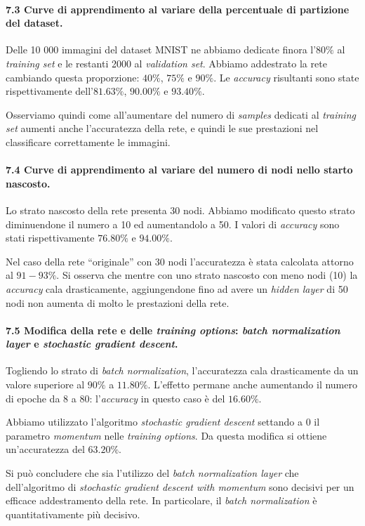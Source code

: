 \documentclass[a4paper,12pt]{article}
\begin{document}
\paragraph{7.3 Curve di apprendimento al variare della percentuale di partizione del dataset.} Delle 10 000 immagini del dataset MNIST ne abbiamo dedicate finora l'$80\%$ al \emph{training set} e le restanti 2000 al \emph{validation set}. Abbiamo addestrato la rete cambiando questa proporzione: $40\%$, $75\%$ e $90\%$. Le \emph{accuracy} risultanti sono state rispettivamente dell'$81.63\%$, $90.00\%$ e $93.40\%$.

Osserviamo quindi come all'aumentare del numero di \emph{samples} dedicati al \emph{training set} aumenti anche l'accuratezza della rete, e quindi le sue prestazioni nel classificare correttamente le immagini.


\paragraph{7.4 Curve di apprendimento al variare del numero di nodi nello starto nascosto.} Lo strato nascosto della rete presenta 30 nodi. Abbiamo modificato questo strato diminuendone il numero a 10 ed aumentandolo a 50. I valori di \emph{accuracy} sono stati rispettivamente $76.80\%$ e $94.00\%$.

Nel caso della rete ``originale'' con 30 nodi l'accuratezza è stata calcolata attorno al $91-93\%$. Si osserva che mentre con uno strato nascosto con meno nodi (10) la \emph{accuracy} cala drasticamente, aggiungendone fino ad avere un \emph{hidden layer} di 50 nodi non aumenta di molto le prestazioni della rete.


\paragraph{7.5 Modifica della rete e delle \emph{training options}: \emph{batch normalization layer} e \emph{stochastic gradient descent}.} Togliendo lo strato di \emph{batch normalization}, l'accuratezza cala drasticamente da un valore superiore al $90\%$ a $11.80\%$. L'effetto permane anche aumentando il numero di epoche da 8 a 80: l'\emph{accuracy} in questo caso è del $16.60\%$.

Abbiamo utilizzato l'algoritmo \emph{stochastic gradient descent} settando a 0 il parametro \emph{mo\-men\-tum} nelle \emph{training options}. Da questa modifica si ottiene un'accuratezza del $63.20\%$.

Si può concludere che sia l'utilizzo del \emph{batch normalization layer} che dell'algoritmo di \emph{stochastic gradient descent with momentum} sono decisivi per un efficace addestramento della rete. In particolare, il \emph{batch normalization} è quantitativamente più decisivo.
\end{document}
